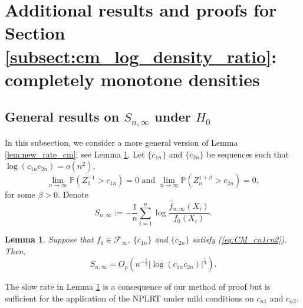\documentclass[12pt,letterpaper, twoside, openany]{article}
\theoremstyle{plain}
\newtheorem{lemma}[theorem]{Lemma}
\newtheorem{corollary}[theorem]{Corollary}
\begin{document}
\section{Additional results and proofs for Section \ref{subsect:cm_log_density_ratio}: completely monotone densities}


\subsection{General results on $S_{n,\infty}$ under $H_0$}\label{subsect:cm_general}
In this subsection, we consider a more general version of Lemma \ref{lem:new_rate_cm}; see Lemma \ref{lem:rate_cm}.
    Let $\{c_{1n}\}$ and $\{c_{2n}\}$ be sequences such that $\log (c_{1n} c_{2n}) = o(n^2)$,
    \begin{equation}\label{eq:CM_cn1cn2}
        \lim_{n \rightarrow \infty} \mathbb{P}(Z^{-1}_1 > c_{1n}) =0 \text{ and } 	\lim_{n \rightarrow \infty} \mathbb{P}(Z^{1+ \beta}_n > c_{2n}) = 0,
    \end{equation}
    for some $\beta > 0$. 
    Denote 
    \begin{equation}\label{eq:def_Kn}
        S_{n, \infty} := - \frac{1}{n} \sum^n_{i=1} \log \frac{\hat{f}_{n,\infty}(X_i)}{f_0(X_i)}.
    \end{equation}
    \begin{lemma}\label{lem:rate_cm}
        Suppose that $f_0\in \mathcal{F}_\infty$, $\{c_{1n}\}$ and $\{c_{2n}\}$ satisfy (\ref{eq:CM_cn1cn2}). Then,
        \begin{equation}\label{eq:CM_LRT_rate}
            S_{n,\infty} = O_p\left( n^{-\frac{2}{3}} |\log (c_{1n} c_{2n}) |^{\frac{1}{3}}\right).
        \end{equation}
    \end{lemma}
    
    The slow rate in Lemma \ref{lem:rate_cm} is a consequence of our method of proof but is sufficient for the application of the NPLRT under mild conditions on $c_{n1}$ and $c_{n2}$.
	
		
		
		
\end{document}
